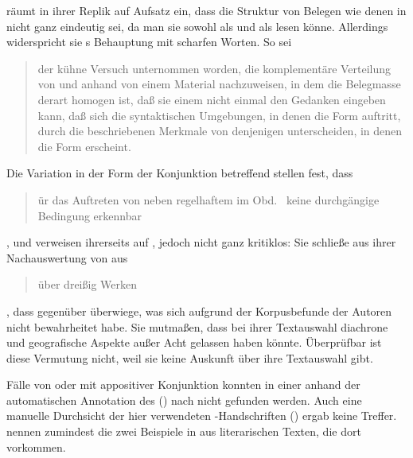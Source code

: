 \citet[187]{gjelsten1980} räumt in ihrer Replik auf 
Aufsatz ein, dass die Struktur von Belegen wie denen in 
nicht ganz eindeutig sei, da man sie sowohl als  und als  lesen könne. Allerdings widerspricht sie
\citeauthor{askedal1974}s Behauptung mit scharfen Worten. So sei
\blockcquote[196]{gjelsten1980}{der kühne Versuch unternommen worden, die
komplementäre Verteilung von  und
 anhand von einem Material nachzuweisen, in dem die Belegmasse
derart homogen ist, daß sie einem nicht einmal den Gedanken
eingeben kann, daß sich die syntaktischen Umgebungen, in denen die Form
 auftritt, durch die beschriebenen Merkmale von denjenigen
unterscheiden, in denen die Form  erscheint.}

Die Variation in der Form der Konjunktion betreffend stellen
\citet[628]{ksw2} fest, dass \blockquote{ür das Auftreten von
 neben regelhaftem  im Obd.\ \textelp{} keine
durchgängige Bedingung erkennbar }, und
verweisen ihrerseits auf \citet{gjelsten1980}, jedoch nicht ganz kritiklos: Sie
schließe aus ihrer Nachauswertung von  aus
\blockcquote[198]{gjelsten1980}{über dreißig Werken}, dass 
gegenüber  überwiege, was sich aufgrund der
Korpusbefunde der Autoren nicht bewahrheitet habe.
Sie mutmaßen, dass \citeauthor{gjelsten1980} bei ihrer Textauswahl
diachrone und geografische Aspekte außer
Acht gelassen haben könnte. Überprüfbar ist diese Vermutung nicht, weil sie
keine Auskunft über ihre Textauswahl gibt.

Fälle von   oder 
 mit appositiver Konjunktion
konnten in einer  anhand der automatischen
Annotation des  (\CAO) nach \citet{schmid2019} nicht gefunden werden. Auch
eine manuelle Durchsicht der hier verwendeten -Handschriften
(\KC) ergab keine Treffer. \citet[626]{ksw2} nennen zumindest die zwei
Beispiele in  aus literarischen Texten, die dort
 vorkommen.

